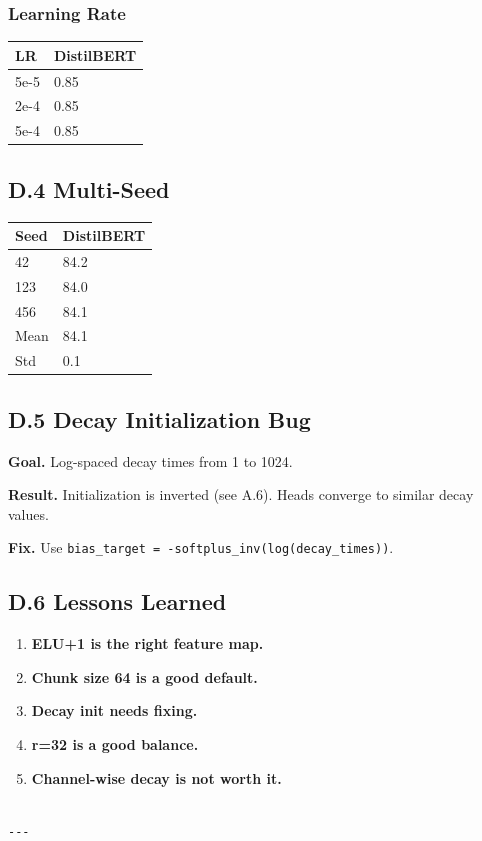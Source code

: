 \subsubsection{Learning Rate}

\begin{table}[H]
\centering
\small
\begin{tabular}{ll}
\toprule
\textbf{LR} & \textbf{DistilBERT} \\
\midrule
5e-5 & 0.85 \\
2e-4 & 0.85 \\
5e-4 & 0.85 \\
\bottomrule
\end{tabular}
\end{table}

\subsection{D.4 Multi-Seed}

\begin{table}[H]
\centering
\small
\begin{tabular}{ll}
\toprule
\textbf{Seed} & \textbf{DistilBERT} \\
\midrule
42 & 84.2 \\
123 & 84.0 \\
456 & 84.1 \\
Mean & 84.1 \\
Std & 0.1 \\
\bottomrule
\end{tabular}
\end{table}

\subsection{D.5 Decay Initialization Bug}

\textbf{Goal.} Log-spaced decay times from 1 to 1024.

\textbf{Result.} Initialization is inverted (see A.6). Heads converge to 
similar decay values.

\textbf{Fix.} Use \texttt{bias\_target = -softplus\_inv(log(decay\_times))}.

\subsection{D.6 Lessons Learned}

\begin{enumerate}
\item \textbf{ELU+1 is the right feature map.}
\item \textbf{Chunk size 64 is a good default.}
\item \textbf{Decay init needs fixing.}
\item \textbf{r=32 is a good balance.}
\item \textbf{Channel-wise decay is not worth it.}
\end{enumerate}
\begin{lstlisting}

---
\end{lstlisting}


